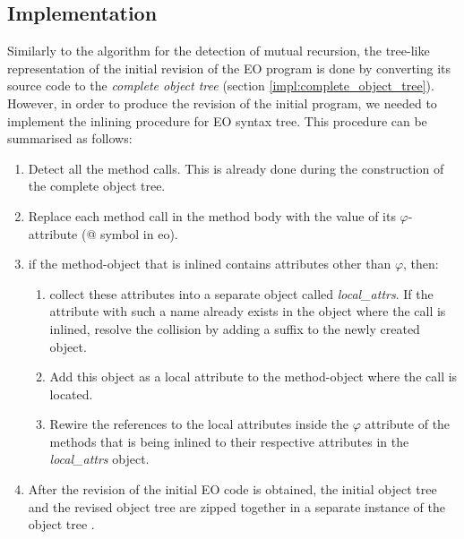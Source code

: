 \subsection{Implementation}
Similarly to the algorithm for the detection of mutual recursion, the tree-like representation of the initial revision of the EO program is done by converting its source code to the \textit{complete object tree} (section \ref{impl:complete_object_tree}). However, in order to produce the revision of the initial program, we needed to implement the inlining procedure for EO syntax tree. This procedure can be summarised as follows:
\begin{enumerate}
  \item Detect all the method calls. This is already done during the construction of the complete object tree.
  \item Replace each method call in the method body with the value of its $\varphi$-attribute (@ symbol in eo).
  \item if the method-object that is inlined contains attributes other than $\varphi$, then:
  \begin{enumerate}
    \item collect these attributes into a separate object called \textit{local\_attrs}. If the attribute with such a name already exists in the object where the call is inlined, resolve the collision by adding a suffix to the newly created object. 
    \item Add this object as a local attribute to the method-object where the call is located. 
    \item Rewire the references to the local attributes inside the $\varphi$ attribute of the methods that is being inlined to their respective attributes in the \textit{local\_attrs} object.
  \end{enumerate}

  \item After the revision of the initial EO code is obtained, the initial object tree and the revised object tree are zipped together in a separate instance of the object tree .


\end{enumerate}
